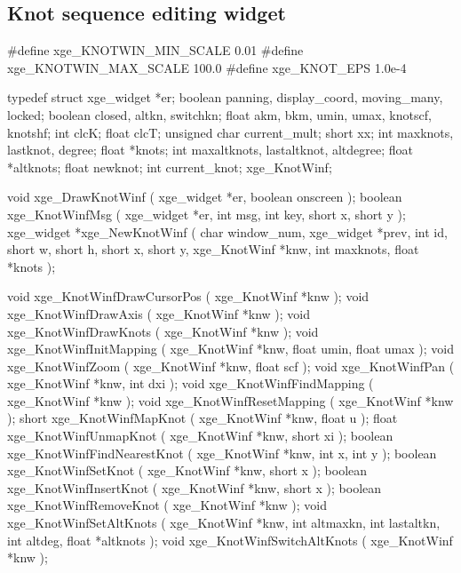 \subsection{Knot sequence editing widget}

\begin{listingC}
#define xge_KNOTWIN_MIN_SCALE   0.01
#define xge_KNOTWIN_MAX_SCALE  100.0
#define xge_KNOT_EPS          1.0e-4
\end{listingC}

\begin{listingC}
typedef struct {
    xge_widget    *er;
    boolean       panning, display_coord, moving_many, locked;
    boolean       closed, altkn, switchkn;
    float         akm, bkm, umin, umax, knotscf, knotshf;
    int           clcK;
    float         clcT;
    unsigned char current_mult;
    short         xx;
    int           maxknots, lastknot, degree;
    float         *knots;
    int           maxaltknots, lastaltknot, altdegree;
    float         *altknots;
    float         newknot;
    int           current_knot;
  } xge_KnotWinf;
\end{listingC}

\begin{listingC}
void xge_DrawKnotWinf ( xge_widget *er, boolean onscreen );
boolean xge_KnotWinfMsg ( xge_widget *er,
                          int msg, int key, short x, short y );
xge_widget *xge_NewKnotWinf ( char window_num, xge_widget *prev,
                      int id,
                      short w, short h, short x, short y,
                      xge_KnotWinf *knw, int maxknots, float *knots );

void xge_KnotWinfDrawCursorPos ( xge_KnotWinf *knw );
void xge_KnotWinfDrawAxis ( xge_KnotWinf *knw );
void xge_KnotWinfDrawKnots ( xge_KnotWinf *knw );
void xge_KnotWinfInitMapping ( xge_KnotWinf *knw,
                               float umin, float umax );
void xge_KnotWinfZoom ( xge_KnotWinf *knw, float scf );
void xge_KnotWinfPan ( xge_KnotWinf *knw, int dxi );
void xge_KnotWinfFindMapping ( xge_KnotWinf *knw );
void xge_KnotWinfResetMapping ( xge_KnotWinf *knw );
short xge_KnotWinfMapKnot ( xge_KnotWinf *knw, float u );
float xge_KnotWinfUnmapKnot ( xge_KnotWinf *knw, short xi );
boolean xge_KnotWinfFindNearestKnot ( xge_KnotWinf *knw,
                                      int x, int y );
boolean xge_KnotWinfSetKnot ( xge_KnotWinf *knw, short x );
boolean xge_KnotWinfInsertKnot ( xge_KnotWinf *knw, short x );
boolean xge_KnotWinfRemoveKnot ( xge_KnotWinf *knw );
void xge_KnotWinfSetAltKnots ( xge_KnotWinf *knw,
         int altmaxkn, int lastaltkn, int altdeg, float *altknots );
void xge_KnotWinfSwitchAltKnots ( xge_KnotWinf *knw );
\end{listingC}


